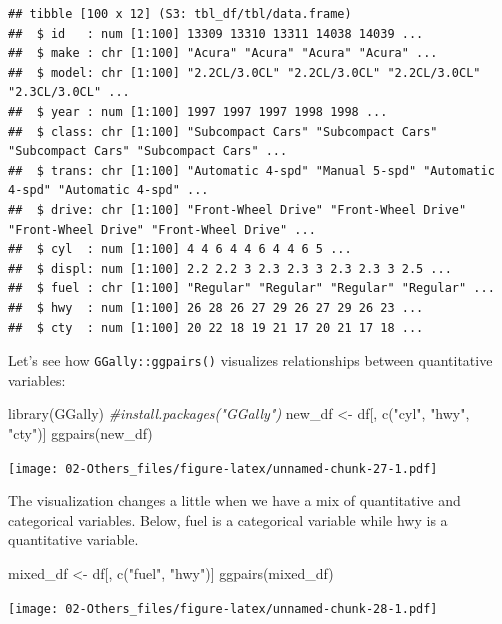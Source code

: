 \documentclass[
]{book}
\newenvironment{Shaded}{\begin{snugshade}}{\end{snugshade}}
\newcommand{\CommentTok}[1]{\textcolor[rgb]{0.56,0.35,0.01}{\textit{#1}}}
\newcommand{\FunctionTok}[1]{\textcolor[rgb]{0.00,0.00,0.00}{#1}}
\newcommand{\NormalTok}[1]{#1}
\newcommand{\OtherTok}[1]{\textcolor[rgb]{0.56,0.35,0.01}{#1}}
\newcommand{\StringTok}[1]{\textcolor[rgb]{0.31,0.60,0.02}{#1}}
\begin{document}
\begin{verbatim}
## tibble [100 x 12] (S3: tbl_df/tbl/data.frame)
##  $ id   : num [1:100] 13309 13310 13311 14038 14039 ...
##  $ make : chr [1:100] "Acura" "Acura" "Acura" "Acura" ...
##  $ model: chr [1:100] "2.2CL/3.0CL" "2.2CL/3.0CL" "2.2CL/3.0CL" "2.3CL/3.0CL" ...
##  $ year : num [1:100] 1997 1997 1997 1998 1998 ...
##  $ class: chr [1:100] "Subcompact Cars" "Subcompact Cars" "Subcompact Cars" "Subcompact Cars" ...
##  $ trans: chr [1:100] "Automatic 4-spd" "Manual 5-spd" "Automatic 4-spd" "Automatic 4-spd" ...
##  $ drive: chr [1:100] "Front-Wheel Drive" "Front-Wheel Drive" "Front-Wheel Drive" "Front-Wheel Drive" ...
##  $ cyl  : num [1:100] 4 4 6 4 4 6 4 4 6 5 ...
##  $ displ: num [1:100] 2.2 2.2 3 2.3 2.3 3 2.3 2.3 3 2.5 ...
##  $ fuel : chr [1:100] "Regular" "Regular" "Regular" "Regular" ...
##  $ hwy  : num [1:100] 26 28 26 27 29 26 27 29 26 23 ...
##  $ cty  : num [1:100] 20 22 18 19 21 17 20 21 17 18 ...
\end{verbatim}

Let's see how \texttt{GGally::ggpairs()} visualizes relationships between quantitative variables:

\begin{Shaded}
\begin{Highlighting}[]
\FunctionTok{library}\NormalTok{(GGally) }\CommentTok{\#install.packages("GGally")}
\NormalTok{new\_df }\OtherTok{\textless{}{-}}\NormalTok{ df[, }\FunctionTok{c}\NormalTok{(}\StringTok{"cyl"}\NormalTok{, }\StringTok{"hwy"}\NormalTok{, }\StringTok{"cty"}\NormalTok{)]}
\FunctionTok{ggpairs}\NormalTok{(new\_df)}
\end{Highlighting}
\end{Shaded}

\texttt{[image: 02-Others\_files/figure-latex/unnamed-chunk-27-1.pdf]}

The visualization changes a little when we have a mix of quantitative and categorical variables. Below, fuel is a categorical variable while hwy is a quantitative variable.

\begin{Shaded}
\begin{Highlighting}[]
\NormalTok{mixed\_df }\OtherTok{\textless{}{-}}\NormalTok{ df[, }\FunctionTok{c}\NormalTok{(}\StringTok{"fuel"}\NormalTok{, }\StringTok{"hwy"}\NormalTok{)]}
\FunctionTok{ggpairs}\NormalTok{(mixed\_df)}
\end{Highlighting}
\end{Shaded}

\texttt{[image: 02-Others\_files/figure-latex/unnamed-chunk-28-1.pdf]}
\end{document}
